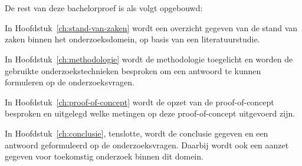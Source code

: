 \section{}%
\label{sec:opzet-bachelorproef}


De rest van deze bachelorproef is als volgt opgebouwd:

In Hoofdstuk~\ref{ch:stand-van-zaken} wordt een overzicht gegeven van de stand van zaken binnen het onderzoeksdomein, op basis van een literatuurstudie.

In Hoofdstuk~\ref{ch:methodologie} wordt de methodologie toegelicht en worden de gebruikte onderzoekstechnieken besproken om een antwoord te kunnen formuleren op de onderzoeksvragen.

In Hoofdstuk~\ref{ch:proof-of-concept} wordt de opzet van de proof-of-concept besproken en uitgelegd welke metingen op deze proof-of-concept uitgevoerd zijn.

In Hoofdstuk~\ref{ch:conclusie}, tenslotte, wordt de conclusie gegeven en een antwoord geformuleerd op de onderzoeksvragen. Daarbij wordt ook een aanzet gegeven voor toekomstig onderzoek binnen dit domein.